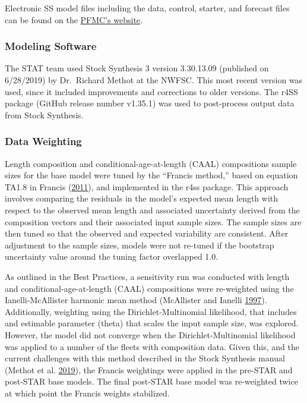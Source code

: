 \documentclass[12pt,]{article}
\begin{document}
Electronic SS model files including the data, control, starter, and
forecast files can be found on the
\href{https://www.pcouncil.org/groundfish/stock-assessments/}{PFMC's
website}.

\subsubsection{Modeling Software}\label{modeling-software}

The STAT team used Stock Synthesis 3 version 3.30.13.09 (published on
6/28/2019) by Dr.~Richard Methot at the NWFSC. This most recent version
was used, since it included improvements and corrections to older
versions. The r4SS package (GitHub release number v1.35.1) was used to
post-process output data from Stock Synthesis.

\subsubsection{Data Weighting}\label{data-weighting}

Length composition and conditional-age-at-length (CAAL) compositions
sample sizes for the base model were tuned by the ``Francis method,''
based on equation TA1.8 in Francis
(\protect\hyperlink{ref-Francis2011}{2011}), and implemented in the r4ss
package. This approach involves comparing the residuals in the model's
expected mean length with respect to the observed mean length and
associated uncertainty derived from the composition vectors and their
associated input sample sizes. The sample sizes are then tuned so that
the observed and expected variability are consistent. After adjustment
to the sample sizes, models were not re-tuned if the bootstrap
uncertainty value around the tuning factor overlapped 1.0.

As outlined in the Best Practices, a sensitivity run was conducted with
length and conditional-age-at-length (CAAL) compositions were
re-weighted using the Ianelli-McAllister harmonic mean method
(McAllister and Ianelli \protect\hyperlink{ref-McAllister1997}{1997}).
Additionally, weighting using the Dirichlet-Multinomial likelihood, that
includes and estimable parameter (theta) that scales the input sample
size, was explored. However, the model did not converge when the
Dirichlet-Multinomial likelihood was applied to a number of the fleets
with composition data. Given this, and the current challenges with this
method described in the Stock Synthesis manual (Methot et al.
\protect\hyperlink{ref-Methot2019}{2019}), the Francis weightings were
applied in the pre-STAR and post-STAR base models. The final post-STAR
base model was re-weighted twice at which point the Francis weights
stabilized.
\end{document}
